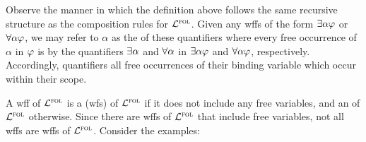 
Observe the manner in which the definition above follows the same recursive structure as the composition rules for $\mathcal{L}^{\textsc{fol}}$.
Given any wffs of the form $\exists \alpha \varphi$ or $\forall \alpha \varphi$, we may refer to $\alpha$ as the  of these quantifiers where every free occurrence of $\alpha$ in $\varphi$ is  by the quantifiers $\exists \alpha$ and $\forall \alpha$ in $\exists \alpha \varphi$ and $\forall \alpha \varphi$, respectively. 
Accordingly, quantifiers  all free occurrences of their binding variable which occur within their scope.

A wff of $\mathcal{L}^{\textsc{fol}}$ is a  (wfs) of $\mathcal{L}^{\textsc{fol}}$ if it does not include any free variables, and an  of $\mathcal{L}^{\textsc{fol}}$ otherwise.
Since there are wffs of $\mathcal{L}^{\textsc{fol}}$ that include free variables, not all wffs are wffs of $\mathcal{L}^{\textsc{fol}}$.
Consider the examples:

